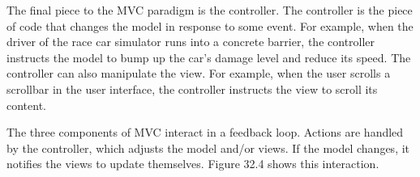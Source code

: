 The final piece to the MVC paradigm is the controller. The controller is the piece of code that changes the model in response to some event. For example, when the driver of the race car simulator runs into a concrete barrier, the controller instructs the model to bump up the car’s damage level and reduce its speed. The controller can also manipulate the view. For example, when the user scrolls a scrollbar in the user interface, the controller instructs the view to scroll its content.

The three components of MVC interact in a feedback loop. Actions are handled by the controller, which adjusts the model and/or views. If the model changes, it notifies the views to update themselves. Figure 32.4 shows this interaction.













